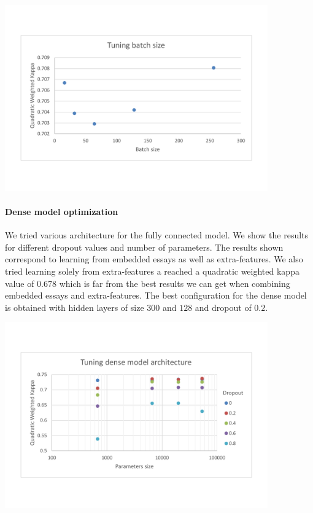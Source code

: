 \documentclass[a4paper,12pt,english]{article}
\begin{document}
\begin{center}
\vspace*{-1.5cm}
\includegraphics[width=0.85\textwidth]{fig/tune_bs.pdf}
\vspace*{-1.5cm}
\end{center}

\paragraph{Dense model optimization} We tried various architecture for the fully connected model. We show the results for different dropout values and number of parameters. The results shown correspond to learning from embedded essays as well as extra-features. We also tried learning solely from extra-features a reached a quadratic weighted kappa value of $0.678$ which is far from the best results we can get when combining embedded essays and extra-features. The best configuration for the dense model is obtained with hidden layers of size $300$ and $128$ and dropout of $0.2$.

\begin{center}
\vspace*{-1.5cm}
\includegraphics[width=0.85\textwidth]{fig/tune_dense_arch.pdf}
\vspace*{-1.5cm}
\end{center}
\end{document}
